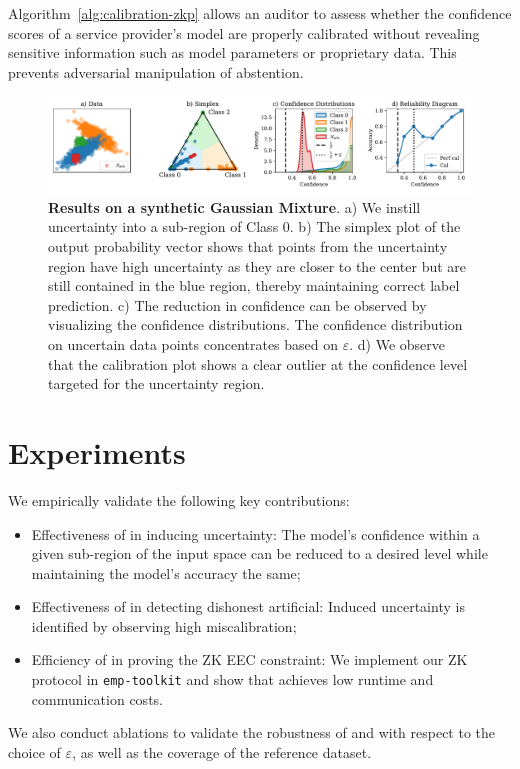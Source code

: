 Algorithm~\ref{alg:calibration-zkp} allows an auditor to assess whether the confidence scores of a service provider's model are properly calibrated without revealing sensitive information such as model parameters or proprietary data. This prevents adversarial manipulation of abstention.

\begin{figure}[t]
    \centering
    \includegraphics[width=\linewidth]{figs/confidential_guardian/gauss_res.pdf}
    \caption[Results on a synthetic Gaussian Mixture.]{\textbf{Results on a synthetic Gaussian Mixture}. a) We instill uncertainty into a sub-region of Class 0. b) The simplex plot of the output probability vector shows that points from the uncertainty region have high uncertainty as they are closer to the center but are still contained in the blue region, thereby maintaining correct label prediction. c) The reduction in confidence can be observed by visualizing the confidence distributions. The confidence distribution on uncertain data points concentrates based on $\varepsilon$. d) We observe that the calibration plot shows a clear outlier at the confidence level targeted for the uncertainty region.}
    \label{fig:gaussian}
\end{figure}

\section{Experiments}

We empirically validate the following key contributions:
\begin{itemize}
    \item Effectiveness of \attack in inducing uncertainty: The model's confidence within a given sub-region of the input space can be reduced to a desired level while maintaining the model's accuracy the same; 
    \item Effectiveness of \name in detecting dishonest artificial: Induced uncertainty is identified by observing high miscalibration; 
    \item Efficiency of \name in proving the ZK EEC constraint: We implement our ZK protocol in \texttt{emp-toolkit} and show that \name achieves low runtime and communication costs.    
\end{itemize}
We also conduct ablations to validate the robustness of \attack and \name with respect to the choice of $\varepsilon$, as well as the coverage of the reference dataset.  

